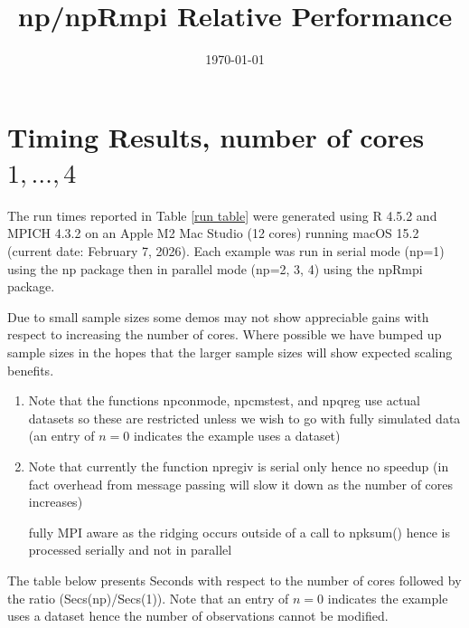 \documentclass[]{amsart}
\date{\today}
\title{np/npRmpi Relative Performance}
\begin{document}
\maketitle

\section*{Timing Results, number of cores $1,\dots,4$}

The run times reported in Table \ref{run table} were generated using R
4.5.2 and MPICH 4.3.2 on an Apple M2 Mac Studio (12 cores) running
macOS 15.2 (current date: February 7, 2026). Each example was run in
serial mode (np=1) using the np package then in parallel mode (np=2, 3,
4) using the npRmpi package.

Due to small sample sizes some demos may not show appreciable gains
with respect to increasing the number of cores. Where possible we have
bumped up sample sizes in the hopes that the larger sample sizes will
show expected scaling benefits.  

\begin{enumerate}

\item Note that the functions npconmode, npcmstest, and npqreg use
  actual datasets so these are restricted unless we wish to go with
  fully simulated data (an entry of $n=0$ indicates the example uses a
  dataset)

\item Note that currently the function npregiv is serial only hence no
  speedup (in fact overhead from message passing will slow it down as
  the number of cores increases)

  fully MPI aware as the ridging occurs outside of a call to npksum()
  hence is processed serially and not in parallel

\end{enumerate}

The table below presents Seconds with respect to the number of cores
followed by the ratio (Secs(np)/Secs(1)). Note that
an entry of $n=0$ indicates the example uses a dataset hence the
number of observations cannot be modified.

\begin{table}[!ht]
\scriptsize
\caption{\label{run table}Illustrative timed runs (seconds) with 1
  processor (serial, np package) and 2, 3, and 4 processors (parallel,
  npRmpi package) on an Apple M2 Mac Studio.}

\end{table}
\end{document}
